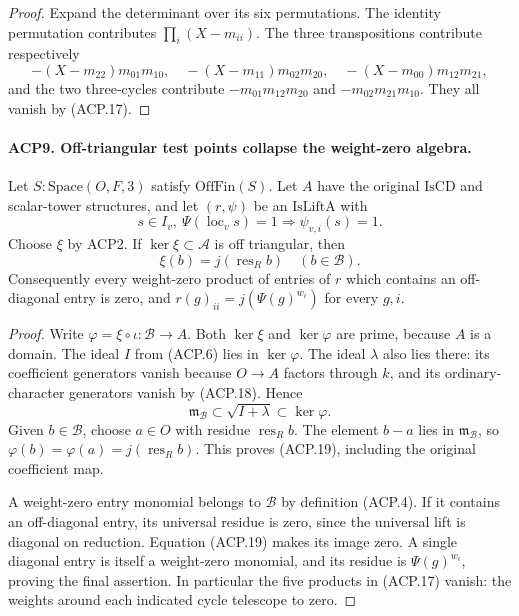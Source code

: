 \begin{proof}
Expand the determinant over its six permutations.  The identity
permutation contributes \(\prod_i(X-m_{ii})\).  The three
transpositions contribute respectively
\[
 -(X-m_{22})m_{01}m_{10},\quad
 -(X-m_{11})m_{02}m_{20},\quad
 -(X-m_{00})m_{12}m_{21},
\]
and the two three-cycles contribute
\(-m_{01}m_{12}m_{20}\) and \(-m_{02}m_{21}m_{10}\).
They all vanish by (ACP.17).
\end{proof}

\paragraph{ACP9. Off-triangular test points collapse the weight-zero algebra.}
\label{claim:ACP9}
Let \(S:\mathrm{Space}(O,F,3)\) satisfy
\(\mathrm{OffFin}(S)\).  Let \(A\) have the original
\(\mathrm{IsCD}\) and scalar-tower structures, and let
\((r,\psi)\) be an \(\mathrm{IsLiftA}\) with
\[
 s\in I_v,\ \Psi(\operatorname{loc}_v s)=1
                         \Longrightarrow\psi_{v,i}(s)=1.
                                                        \tag{ACP.18}
\]
Choose \(\xi\) by ACP2.  If
\(\ker\xi\subset\mathcal A\) is off triangular, then
\[
 \xi(b)=j(\operatorname{res}_R b)\quad(b\in\mathcal B).
                                                        \tag{ACP.19}
\]
Consequently every weight-zero product of entries of \(r\)
which contains an off-diagonal entry is zero, and
\(r(g)_{ii}=j(\Psi(g)^{w_i})\) for every \(g,i\).

\begin{proof}
Write \(\varphi=\xi\circ\iota:\mathcal B\to A\).
Both \(\ker\xi\) and \(\ker\varphi\) are prime, because
\(A\) is a domain.  The ideal \(I\) from (ACP.6) lies in
\(\ker\varphi\).  The ideal \(\lambda\) also lies there:
its coefficient generators vanish because \(O\to A\) factors
through \(k\), and its ordinary-character generators vanish
by (ACP.18).  Hence
\[
 \mathfrak m_{\mathcal B}\subset\sqrt{I+\lambda}
                                      \subset\ker\varphi.
\]
Given \(b\in\mathcal B\), choose \(a\in O\) with residue
\(\operatorname{res}_R b\).  The element \(b-a\) lies in
\(\mathfrak m_{\mathcal B}\), so
\(\varphi(b)=\varphi(a)=j(\operatorname{res}_R b)\).
This proves (ACP.19), including the original coefficient map.

A weight-zero entry monomial belongs to \(\mathcal B\) by
definition (ACP.4).  If it contains an off-diagonal entry,
its universal residue is zero, since the universal lift is
diagonal on reduction.  Equation (ACP.19) makes its image zero.
A single diagonal entry is itself a weight-zero monomial, and
its residue is \(\Psi(g)^{w_i}\), proving the final assertion.
In particular the five products in (ACP.17) vanish: the weights
around each indicated cycle telescope to zero.
\end{proof}

